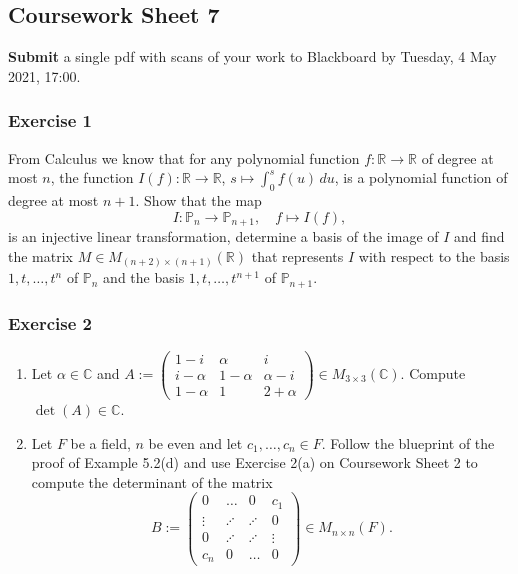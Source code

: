 \documentclass[
  12pt,
  a4paper,
  twoside]{article}
\theoremstyle{plain}
\theoremstyle{definition}
\begin{document}
\hypertarget{coursework-sheet-7}{%
\subsection{Coursework Sheet 7}\label{coursework-sheet-7}}

\textbf{Submit} a single pdf with scans of your work to Blackboard by Tuesday, 4 May 2021, 17:00.

\hypertarget{exercise-1-7}{%
\subsubsection*{Exercise 1}\label{exercise-1-7}}

From Calculus we know that for any polynomial function \(f: \mathbb{R} \rightarrow \mathbb{R}\) of degree at most \(n\), the function \(I(f): \mathbb{R} \rightarrow \mathbb{R}\), \(s \mapsto \int_0^s f(u)\, du\), is a polynomial
function of degree at most \(n+1\). Show that the map
\[I: \mathbb{P}_n \rightarrow \mathbb{P}_{n+1}, \quad f \mapsto I(f),\]
is an injective linear transformation, determine a basis of the
image of \(I\) and find the matrix \(M\in M_{(n+2)\times(n+1)}(\mathbb{R})\)
that represents \(I\) with respect to the basis \(1, t, \ldots, t^n\)
of \(\mathbb{P}_n\) and the basis \(1, t, \ldots, t^{n+1}\) of \(\mathbb{P}_{n+1}\).

\hypertarget{exercise-2-7}{%
\subsubsection*{Exercise 2}\label{exercise-2-7}}

\begin{enumerate}
\def\labelenumi{(\alph{enumi})}
\item
  Let \(\alpha \in \mathbb{C}\) and \(A:= \left(\begin{array}{ccc} 1-i & \alpha & i \\ i-\alpha & 1 - \alpha & \alpha -i \\ 1- \alpha & 1 & 2+ \alpha \end{array}\right) \in M_{3 \times 3}(\mathbb{C})\). Compute
  \(\det(A) \in \mathbb{C}\).
\item
  Let \(F\) be a field, \(n\) be even and let \(c_1, \ldots, c_n \in F\). Follow
  the blueprint of the proof of Example 5.2(d) and use Exercise 2(a) on
  Coursework Sheet 2 to compute the determinant of the matrix
  \[B:= \left(\begin{array}{cccc} 0 &
  \ldots & 0 & c_1 \\ \vdots & \iddots & \iddots & 0 \\ 0 & \iddots
  & \iddots & \vdots \\ c_n & 0 & \ldots & 0 \end{array}\right)
  \in M_{n \times n}(F).\]
\end{enumerate}
\end{document}
